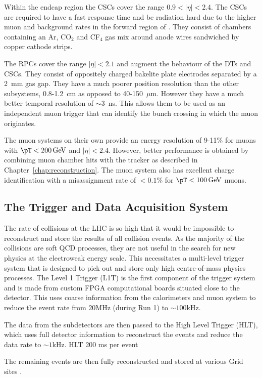 Within the endcap region the \ac{CSC}s cover the range
$0.9<|\eta|<2.4$. The \ac{CSC}s are required to have a fast response
time and be radiation hard due to the higher muon and background rates
in the forward region of \CMS. They consist of chambers containing an
Ar, CO$_2$ and CF$_4$ gas mix around anode wires sandwiched by copper
cathode strips.

The \ac{RPC}s cover the range $|\eta|<2.1$ and augment the behaviour
of the \ac{DT}s and \ac{CSC}s. They consist of oppositely charged
bakelite plate electrodes separated by a 2~mm gas gap. They have a
much poorer position resolution than the other subsystems, 0.8-1.2~cm
as opposed to 40-150~$\mu$m. However they have a much better temporal
resolution of $\sim3$~ns. This allows them to be used as an
independent muon trigger that can identify the bunch crossing in which
the muon originates.

The muon systems on their own provide an energy resolution of 9-11\%
for muons with $\pT<200\gev$ and $|\eta|<2.4$. However, better
performance is obtained by combining muon chamber hits with the
tracker as described in Chapter~\ref{chap:reconstruction}. The muon
system also has excellent charge identification with a misassignment
rate of $<0.1\%$ for $\pT<100\gev$ muons.

\subsection{The Trigger and Data Acquisition System}
\label{sec:triggers} 

The rate of collisions at the LHC is so high that
it would be impossible to reconstruct and store the results of all
collision events. As the majority of the collisions are soft QCD
processes, they are not useful in the search for new physics at the
electroweak energy scale. This necessitates a multi-level trigger
system that is designed to pick out and store only high centre-of-mass
physics processes. The Level 1 Trigger (L1T) is the first component of
the trigger system and is made from custom FPGA computational boards
situated close to the detector. This uses coarse information from the
calorimeters and muon system to reduce the event rate from $20$MHz
(during Run 1) to $\sim100$kHz.

The data from the subdetectors are
then passed to the High Level Trigger (HLT), which uses full detector
information to reconstruct the events and reduce the data rate to
$\sim1$kHz. 
HLT 200 ms per event

The remaining events are then fully reconstructed and
stored at various Grid sites \cite{GridTechDesign}.

